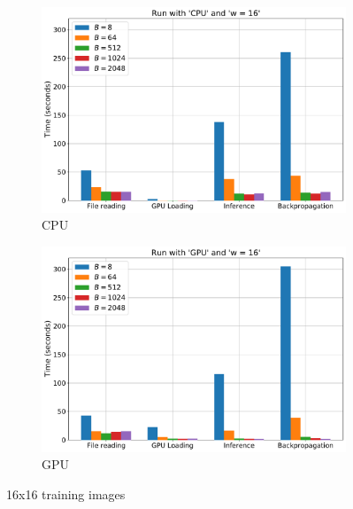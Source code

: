 \documentclass{article}
\begin{document}
{{            \begin{figure}[H]
                \centering
                \begin{subfigure}[]{0.45 \textwidth}
                    \includegraphics[width = 1.0 \textwidth]{Figures/cpu_16x16_full.pdf}
                    \caption{CPU}
                \end{subfigure}
                \begin{subfigure}[]{0.45 \textwidth}
                    \includegraphics[width = 1.0 \textwidth]{Figures/gpu_16x16_full.pdf}
                    \caption{GPU}
                \end{subfigure}
                \caption{16x16 training images}
            \end{figure}
        }
    }
\end{document}
